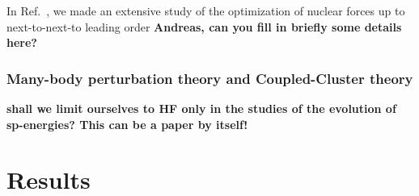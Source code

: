 \documentclass[aps,showpacs,floatfix,nofootinbib,preprintnumbers,superscriptaddress,amsmath,amssymb]{revtex4-1}
\begin{document}
In Ref.~\cite{carlsson2014}, we made an extensive study of the optimization of nuclear forces up to next-to-next-to leading order 
{\bf Andreas, can you fill in briefly some details here?}


\subsubsection{Many-body perturbation theory and Coupled-Cluster theory}
{\bf shall we limit ourselves to HF only in the studies of the evolution of sp-energies?  This can be a paper by itself!}

\section{Results}\label{sec:results}
\end{document}
